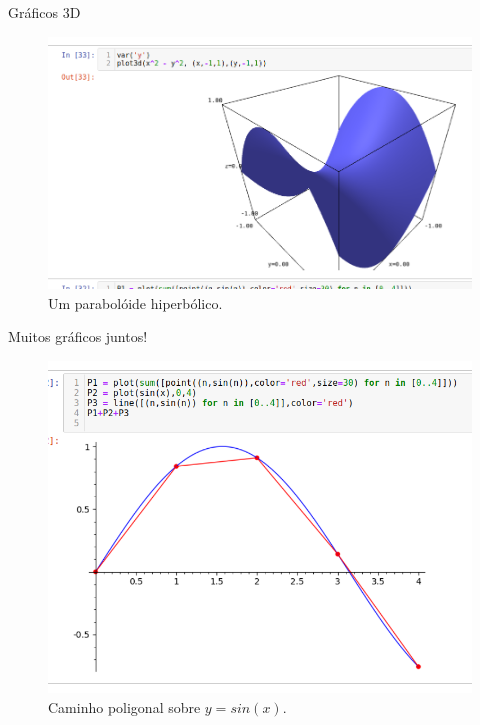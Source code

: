 \documentclass[12pt]{beamer}
\begin{document}
\begin{frame}
  {Gráficos 3D}
  \begin{figure}[h]
    \centering
    \includegraphics[scale=0.3]{img/grafico03.png}
    \caption{Um parabolóide hiperbólico.}
    \label{img:graficoparab}
  \end{figure}
\end{frame}

\begin{frame}
  {Muitos gráficos juntos!}
  \begin{figure}[h]
    \centering
    \includegraphics[scale=0.4]{img/grafico04.png}
    \caption{Caminho poligonal sobre $y = sin(x)$.}
    \label{img:graficopolig}
  \end{figure}
\end{frame}
\end{document}
